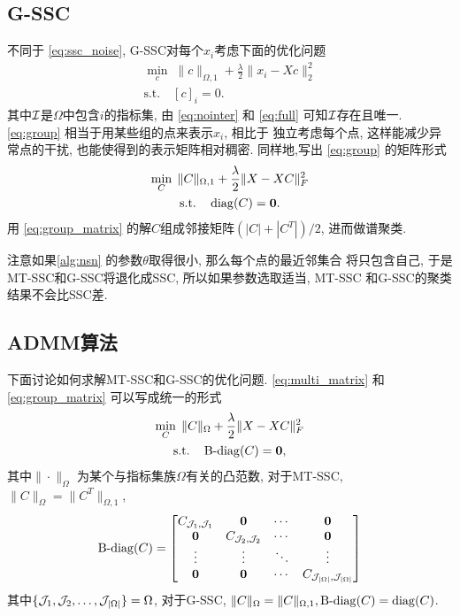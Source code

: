 \subsection{G-SSC}
不同于 \eqref{eq:ssc_noise},   G-SSC对每个\(x_i\)考虑下面的优化问题
\begin{equation}
  \begin{gathered}
    \min_{c} \; \|c\|_{\Omega, 1} + \frac{\lambda}{2} \|x_i - Xc\|_2^2\\
    \text{s.t.} \quad [c]_i = 0.
  \end{gathered}
  \label{eq:group}
\end{equation}
其中\(\mathcal{I}\)是\(\Omega\)中包含\(i\)的指标集, 由 \eqref{eq:nointer} 和 \eqref{eq:full} 
可知\(\mathcal{I}\)存在且唯一. \eqref{eq:group} 相当于用某些组的点来表示\(x_i\), 相比于
独立考虑每个点, 这样能减少异常点的干扰, 也能使得到的表示矩阵相对稠密.
同样地,写出 \eqref{eq:group} 的矩阵形式
\begin{equation}
  \begin{gathered}
    \min_C\; \|C\|_{\Omega, 1} + \frac{\lambda}{2} \|X-XC\|_F^2 \\
    \text{s.t.} \quad \operatorname{diag}(C) = \mathbf{0}.
  \end{gathered}
  \label{eq:group_matrix}
\end{equation}
用 \eqref{eq:group_matrix} 的解\(C\)组成邻接矩阵\((|C|+|C^T|)/2\), 进而做谱聚类.

注意如果\autoref{alg:nsn} 的参数\(\theta\)取得很小, 那么每个点的最近邻集合
将只包含自己, 于是MT-SSC和G-SSC将退化成SSC, 所以如果参数选取适当, MT-SSC
和G-SSC的聚类结果不会比SSC差.

\subsection{ADMM算法}
下面讨论如何求解MT-SSC和G-SSC的优化问题.
 \eqref{eq:multi_matrix} 和 \eqref{eq:group_matrix} 可以写成统一的形式
\begin{equation}\label{eq:MatrixLasso}
  \begin{gathered}
    \min_{C} \; \|C\|_{\Omega}+\frac{\lambda}{2}\|X-XC\|_F^2  \\
    \text{s.t.} \quad \operatorname{B-diag}(C)=\mathbf{0},
  \end{gathered}
\end{equation}
其中\(\|\cdot\|_{\Omega}\) 为某个与指标集族\(\Omega\)有关的凸范数,
对于MT-SSC, \(\|C\|_{\Omega}=\|C^T\|_{\Omega, 1}\), 
\[
  \operatorname{B-diag}(C)=\begin{bmatrix}
    C_{\mathcal{J}_1, \mathcal{J}_1}  & \mathbf{0} & \cdots & \mathbf{0} \\
    \mathbf{0}  & C_{\mathcal{J}_2, \mathcal{J}_2} & \cdots & \mathbf{0} \\
    \vdots   &    \vdots    &    \ddots     & \vdots \\
    \mathbf{0}  &  \mathbf{0} &  \cdots  & C_{\mathcal{J}_{|\Omega|},\mathcal{J}_{|\Omega|}}
  \end{bmatrix}
\]
其中\(\{\mathcal{J}_1, \mathcal{J}_2,\ldots,\mathcal{J}_{|\Omega|}\}=\Omega\),
对于G-SSC, \(\|C\|_{\Omega}=\|C\|_{\Omega, 1}, \operatorname{B-diag}(C) = \operatorname{diag}(C)\).

